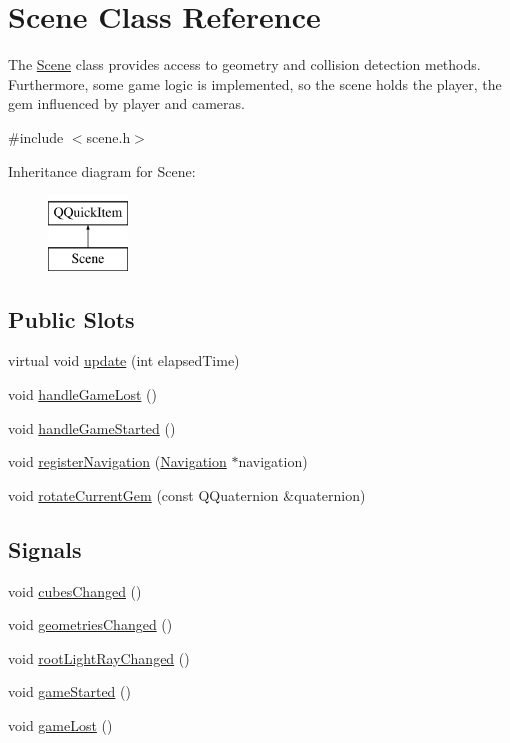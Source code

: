 \hypertarget{class_scene}{\section{Scene Class Reference}
\label{class_scene}
}


The \hyperlink{class_scene}{Scene} class provides access to geometry and collision detection methods. Furthermore, some game logic is implemented, so the scene holds the player, the gem influenced by player and cameras.  




{\ttfamily \#include $<$scene.\+h$>$}

Inheritance diagram for Scene\+:\begin{figure}[H]
\begin{center}
\leavevmode
\includegraphics[height=2.000000cm]{class_scene}
\end{center}
\end{figure}
\subsection*{Public Slots}
\begin{DoxyCompactItemize}
\item 
virtual void \hyperlink{class_scene_a0c9213091fb06643b95801d2b406878f}{update} (int elapsed\+Time)
\item 
void \hyperlink{class_scene_a3f593e4e80703153633a76cc628ab539}{handle\+Game\+Lost} ()
\item 
void \hyperlink{class_scene_aceda1edb06b179bd439539965998f7da}{handle\+Game\+Started} ()
\item 
void \hyperlink{class_scene_ace3407a4d148d317a20b1bf205554bc5}{register\+Navigation} (\hyperlink{class_navigation}{Navigation} $\ast$navigation)
\item 
void \hyperlink{class_scene_ade6d7968a2bad7c1dfbae98045a8aa7d}{rotate\+Current\+Gem} (const Q\+Quaternion \&quaternion)
\end{DoxyCompactItemize}
\subsection*{Signals}
\begin{DoxyCompactItemize}
\item 
void \hyperlink{class_scene_a9c23e7cda34a3089165ce18c2ec89c15}{cubes\+Changed} ()
\item 
void \hyperlink{class_scene_a8df7e2ef0bf2910fa03df1c16b255551}{geometries\+Changed} ()
\item 
void \hyperlink{class_scene_a4eed91c96f13a7646830737b820755c4}{root\+Light\+Ray\+Changed} ()
\item 
void \hyperlink{class_scene_a700dd8faf803b34d7b374c5aded06d45}{game\+Started} ()
\item 
void \hyperlink{class_scene_aa73ff5f1f6c873357149afe83c749d09}{game\+Lost} ()
\end{DoxyCompactItemize}
